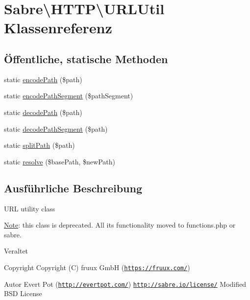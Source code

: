 \hypertarget{class_sabre_1_1_h_t_t_p_1_1_u_r_l_util}{}\section{Sabre\textbackslash{}H\+T\+TP\textbackslash{}U\+R\+L\+Util Klassenreferenz}
\label{class_sabre_1_1_h_t_t_p_1_1_u_r_l_util}
\subsection*{Öffentliche, statische Methoden}
\begin{DoxyCompactItemize}
\item 
static \mbox{\hyperlink{class_sabre_1_1_h_t_t_p_1_1_u_r_l_util_a3b0bc85646ab11c16d5db57d5dfb2997}{encode\+Path}} (\$path)
\item 
static \mbox{\hyperlink{class_sabre_1_1_h_t_t_p_1_1_u_r_l_util_a4d6021bd8769a7c801f83333a79f8e19}{encode\+Path\+Segment}} (\$path\+Segment)
\item 
static \mbox{\hyperlink{class_sabre_1_1_h_t_t_p_1_1_u_r_l_util_aad9df2cd589046fb554c917c86c34458}{decode\+Path}} (\$path)
\item 
static \mbox{\hyperlink{class_sabre_1_1_h_t_t_p_1_1_u_r_l_util_a3f9690f1baca0a99f0ee9647d266932f}{decode\+Path\+Segment}} (\$path)
\item 
static \mbox{\hyperlink{class_sabre_1_1_h_t_t_p_1_1_u_r_l_util_acb4ddfdf2f089e3d5b652e98a9fa6fc5}{split\+Path}} (\$path)
\item 
static \mbox{\hyperlink{class_sabre_1_1_h_t_t_p_1_1_u_r_l_util_a17728bdca3a0f3ddd7626453555331e1}{resolve}} (\$base\+Path, \$new\+Path)
\end{DoxyCompactItemize}


\subsection{Ausführliche Beschreibung}
U\+RL utility class

\mbox{\hyperlink{class_note}{Note}}\+: this class is deprecated. All its functionality moved to functions.\+php or sabre.

\begin{DoxyRefDesc}{Veraltet}
\item[\mbox{\hyperlink{deprecated__deprecated000049}{Veraltet}}]\end{DoxyRefDesc}
\begin{DoxyCopyright}{Copyright}
Copyright (C) fruux GmbH (\href{https://fruux.com/}{\tt https\+://fruux.\+com/}) 
\end{DoxyCopyright}
\begin{DoxyAuthor}{Autor}
Evert Pot (\href{http://evertpot.com/}{\tt http\+://evertpot.\+com/})  \href{http://sabre.io/license/}{\tt http\+://sabre.\+io/license/} Modified B\+SD License 
\end{DoxyAuthor}


